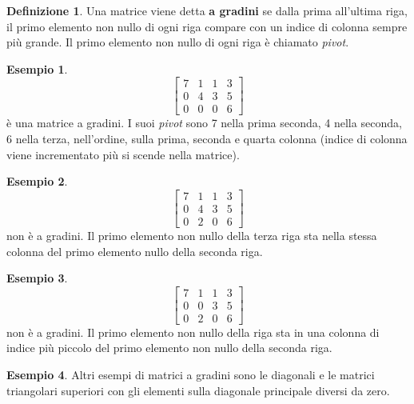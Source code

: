 \documentclass{book}
\theoremstyle{definition}
\newtheorem{defi}{Definizione}[section]
\newtheorem{es}{Esempio}[section]
\theoremstyle{plain}
\begin{document}
\begin{defi}
  \label{defi:matrice6}
  Una matrice viene detta \textbf{a gradini} se dalla prima all'ultima
  riga, il primo elemento non nullo di ogni riga compare con un indice di
  colonna sempre più grande. Il primo elemento non nullo di ogni riga è
  chiamato \textit{pivot}.
  \begin{es}
    \label{es:matrice6-1}
    \begin{equation*}
      \begin{bmatrix}
        7 & 1 & 1 & 3 \\
        0 & 4 & 3 & 5 \\
        0 & 0 & 0 & 6
      \end{bmatrix}
    \end{equation*}
    è una matrice a gradini. I suoi \textit{pivot} sono 7 nella prima
    seconda, 4 nella seconda, 6 nella terza, nell'ordine, sulla prima,
    seconda e quarta colonna (indice di colonna viene incrementato più si
    scende nella matrice).
  \end{es}
  \begin{es}
    \label{es:matrice6-2}
    \begin{equation*}
      \begin{bmatrix}
        7 & 1 & 1 & 3 \\
        0 & 4 & 3 & 5 \\
        0 & 2 & 0 & 6
      \end{bmatrix}
    \end{equation*}
    non è a gradini. Il primo elemento non nullo della terza riga sta
    nella stessa colonna del primo elemento nullo della seconda riga.
  \end{es}
  \begin{es}
    \label{es:matrice6-3}
    \begin{equation*}
      \begin{bmatrix}
        7 & 1 & 1 & 3 \\
        0 & 0 & 3 & 5 \\
        0 & 2 & 0 & 6
      \end{bmatrix}
    \end{equation*}
    non è a gradini. Il primo elemento non nullo della riga sta in una
    colonna di indice più piccolo del primo elemento non nullo della
    seconda riga.
  \end{es}
  \begin{es}
    \label{es:matrice6-4}
    Altri esempi di matrici a gradini sono le diagonali e le matrici
    triangolari superiori con gli elementi sulla diagonale principale
    diversi da zero.
  \end{es}
\end{defi}
\end{document}
